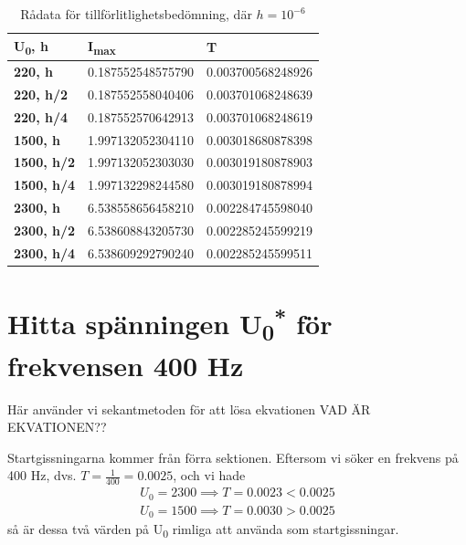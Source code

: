 \documentclass[a4paper, titlepage, 11pt]{article}
\begin{document}
\begin{table}[H]
\caption{Rådata för tillförlitlighetsbedömning, där $h=10^{-6}$}
\begin{center}
\begin{tabular}{l|ll}
\hline
{\color[HTML]{000000} \textbf{U\textsubscript{0}, h}}     & {\color[HTML]{000000} \textbf{I\textsubscript{max}}}   & {\color[HTML]{000000} \textbf{T}}        \\ \hline
{\color[HTML]{000000} \textbf{220, h}}    & {\color[HTML]{000000} 0.187552548575790} & {\color[HTML]{000000} 0.003700568248926} \\
{\color[HTML]{000000} \textbf{220, h/2}}  & {\color[HTML]{000000} 0.187552558040406} & {\color[HTML]{000000} 0.003701068248639} \\
{\color[HTML]{000000} \textbf{220, h/4}}  & {\color[HTML]{000000} 0.187552570642913} & {\color[HTML]{000000} 0.003701068248619} \\ \hline
{\color[HTML]{000000} \textbf{1500, h}}   & {\color[HTML]{000000} 1.997132052304110} & {\color[HTML]{000000} 0.003018680878398} \\
{\color[HTML]{000000} \textbf{1500, h/2}} & {\color[HTML]{000000} 1.997132052303030} & {\color[HTML]{000000} 0.003019180878903} \\
{\color[HTML]{000000} \textbf{1500, h/4}} & {\color[HTML]{000000} 1.997132298244580} & {\color[HTML]{000000} 0.003019180878994} \\ \hline
{\color[HTML]{000000} \textbf{2300, h}}   & {\color[HTML]{000000} 6.538558656458210} & {\color[HTML]{000000} 0.002284745598040} \\
{\color[HTML]{000000} \textbf{2300, h/2}} & {\color[HTML]{000000} 6.538608843205730} & {\color[HTML]{000000} 0.002285245599219} \\
{\color[HTML]{000000} \textbf{2300, h/4}} & {\color[HTML]{000000} 6.538609292790240} & {\color[HTML]{000000} 0.002285245599511}
\end{tabular}
\end{center}
\end{table}


\section{Hitta spänningen U\textsubscript{0}\textsuperscript{*} för frekvensen 400 Hz}
Här använder vi sekantmetoden för att lösa ekvationen VAD ÄR EKVATIONEN??

Startgissningarna kommer från förra sektionen. Eftersom vi söker en frekvens på 400 Hz, dvs. $T = \frac{1}{400} = 0.0025$, och vi hade
\begin{gather*}
    U_0 = 2300 \implies T = 0.0023 < 0.0025 \\
    U_0 = 1500 \implies T = 0.0030 > 0.0025
\end{gather*}
så är dessa två värden på U\textsubscript{0} rimliga att använda som startgissningar.
\end{document}
